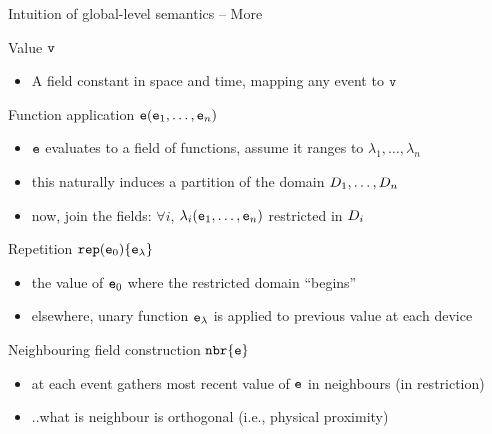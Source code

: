 \documentclass[presentation, 8pt]{beamer}\mode<presentation>{\usetheme{AMSBolognaFC}}
\begin{document}
\begin{frame}[fragile]{Intuition of global-level semantics -- More}
\begin{exampleblock}{Value $\texttt{v}$}
	\begin{itemize}
	\item A field constant in space and time, mapping any event to $\texttt{v}$
	\end{itemize}
	\end{exampleblock}
	\begin{exampleblock}{Function application ${\texttt{e}} (\texttt{e}_1,\ldots,\texttt{e}_n)$}
	\begin{itemize}
	\item $\texttt{e}$ evaluates to a field of functions, assume it ranges to $\lambda_1,\ldots,\lambda_n$
	\item this naturally induces a partition of the domain $D_1,\ldots,D_n$
	\item now, join the fields: $\forall i$, $\lambda_i (\texttt{e}_1,\ldots,\texttt{e}_n)$ restricted in $D_i$
	\end{itemize}
	\end{exampleblock}
	\begin{exampleblock}{Repetition $\texttt{rep}(\texttt{e}_0)\{\texttt{e}_\lambda\}$}
	\begin{itemize}
	\item the value of $\texttt{e}_0$ where the restricted domain ``begins''
	\item elsewhere, unary function $\texttt{e}_\lambda$ is applied to previous value at each device
	\end{itemize}
	\end{exampleblock}
	\begin{exampleblock}{Neighbouring  field construction $\texttt{nbr}\{\texttt{e}\}$}
	\begin{itemize}
	\item at each event gathers most recent value of $\texttt{e}$ in neighbours (in restriction)
	\item ..what is neighbour is orthogonal (i.e., physical proximity)
	\end{itemize}
	\end{exampleblock}
\end{frame}
\end{document}
